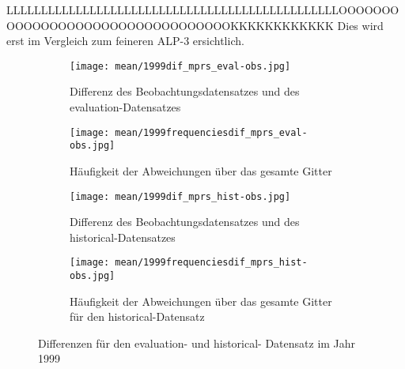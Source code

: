 LLLLLLLLLLLLLLLLLLLLLLLLLLLLLLLLLLLLLLLLLLLLLLLLOOOOOOOOOOOOOOOOOOOOOOOOOOOOOOOOOKKKKKKKKKKKK Dies wird erst im Vergleich zum feineren ALP-3 ersichtlich.\hfill\\

\begin{figure}[h]
	\centering
	\begin{subfigure}[h]{0.49\textwidth}
		\centering
		\texttt{[image: mean/1999dif\_mprs\_eval-obs.jpg]}
		\caption{Differenz des Beobachtungsdatensatzes und des evaluation-Datensatzes}
		\label{fig:eval_dif}
	\end{subfigure}
	\begin{subfigure}[h]{0.49\textwidth}
		\centering
		\texttt{[image: mean/1999frequenciesdif\_mprs\_eval-obs.jpg]}
		\caption{Häufigkeit der Abweichungen über das gesamte Gitter}
		\label{fig:eval_freq_dif}
	\end{subfigure}
	\begin{subfigure}[h]{0.49\textwidth}
		\centering
		\texttt{[image: mean/1999dif\_mprs\_hist-obs.jpg]}
		\caption{Differenz des Beobachtungsdatensatzes und des historical-Datensatzes}
		\label{fig:hist_dif}
	\end{subfigure}
	\begin{subfigure}[h]{0.49\textwidth}
		\centering
		\texttt{[image: mean/1999frequenciesdif\_mprs\_hist-obs.jpg]}
		\caption{Häufigkeit der Abweichungen über das gesamte Gitter für den historical-Datensatz}
		\label{fig:hist_freq_dif}
	\end{subfigure}
	\caption{Differenzen für den evaluation- und historical- Datensatz im Jahr 1999}
\end{figure}

